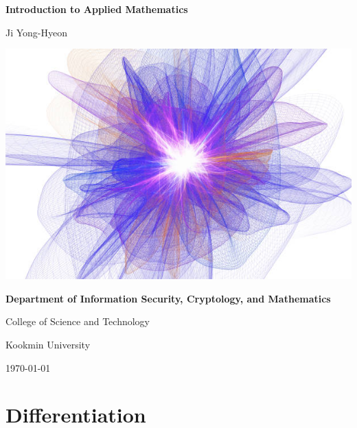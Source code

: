 \documentclass[12pt,openany]{book}
\theoremstyle{definition}
\begin{document}
	
	\begin{titlepage}
		\begin{center}
			{\Huge\textsf{\textbf{Introduction to Applied Mathematics}}\par}
			\vspace{0.5in}
			{\Large Ji Yong-Hyeon\par}
			\vspace{1in}
			\includegraphics[scale=1.75]{iam2.jpg}\par
			\vspace{1in}
			{\bf Department of Information Security, Cryptology, and Mathematics\par}
			{College of Science and Technology\par}
			{Kookmin University\par}
			\vspace{.25in}
			{\large \today\par}
		\end{center}
	\end{titlepage}
	
	\tableofcontents
	
	\mainmatter
	
	\chapter{Differentiation}
\end{document}
